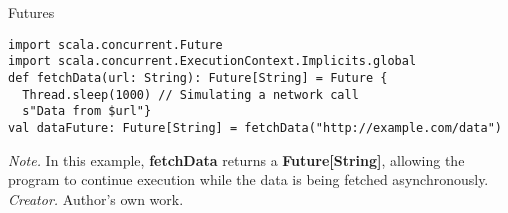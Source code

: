 \begin{table}[h!]
\caption{Futures}
\begin{lstlisting}
import scala.concurrent.Future
import scala.concurrent.ExecutionContext.Implicits.global
def fetchData(url: String): Future[String] = Future {
  Thread.sleep(1000) // Simulating a network call
  s"Data from $url"}
val dataFuture: Future[String] = fetchData("http://example.com/data")
\end{lstlisting}
\small
\textit{Note.} In this example, \textbf{fetchData} returns a \textbf{Future[String]}, allowing the program to continue execution while the data is being fetched asynchronously. 
\textit{Creator.} Author's own work.
\end{table}